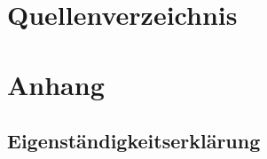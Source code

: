 \appendix

\newpage


\section{Quellenverzeichnis}

\printbibliography

\newpage

\renewcommand{\listfigurename}{Abbildungsverzeichnis}
\listoffigures

\renewcommand{\listfigurename}{Tabellenverzeichnis}
\listoftables

\newpage


\section{Anhang}

\subsection{Eigenständigkeitserklärung}
